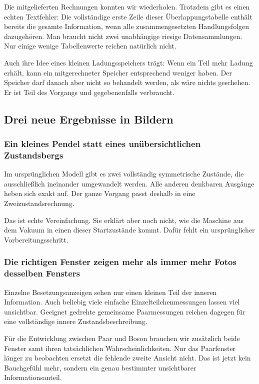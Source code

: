 \documentclass[
  ngerman,
  10pt,
  a4paper,
]{article}
\begin{document}
Die mitgelieferten Rechnungen konnten wir wiederholen. Trotzdem gibt es
einen echten Textfehler: Die vollständige erste Zeile dieser
Überlappungstabelle enthält bereits die gesamte Information, wenn alle
zusammengesetzten Handlungsfolgen dazugehören. Man braucht nicht zwei
unabhängige riesige Datensammlungen. Nur einige wenige Tabellenwerte
reichen natürlich nicht.

Auch ihre Idee eines kleinen Ladungsspeichers trägt: Wenn ein Teil mehr
Ladung erhält, kann ein mitgerechneter Speicher entsprechend weniger
haben. Der Speicher darf danach aber nicht so behandelt werden, als wäre
nichts geschehen. Er ist Teil des Vorgangs und gegebenenfalls
verbraucht.

\subsection{Drei neue Ergebnisse in
Bildern}\label{drei-neue-ergebnisse-in-bildern}

\subsubsection{Ein kleines Pendel statt eines unübersichtlichen
Zustandsbergs}\label{ein-kleines-pendel-statt-eines-unuxfcbersichtlichen-zustandsbergs}

Im ursprünglichen Modell gibt es zwei vollständig symmetrische Zustände,
die ausschließlich ineinander umgewandelt werden. Alle anderen denkbaren
Ausgänge heben sich exakt auf. Der ganze Vorgang passt deshalb in eine
Zweizustandsrechnung.

Das ist echte Vereinfachung. Sie erklärt aber noch nicht, wie die
Maschine aus dem Vakuum in einen dieser Startzustände kommt. Dafür fehlt
ein ursprünglicher Vorbereitungsschritt.

\subsubsection{Die richtigen Fenster zeigen mehr als immer mehr Fotos
desselben
Fensters}\label{die-richtigen-fenster-zeigen-mehr-als-immer-mehr-fotos-desselben-fensters}

Einzelne Besetzungsanzeigen sehen nur einen kleinen Teil der inneren
Information. Auch beliebig viele einfache Einzelteilchenmessungen lassen
viel unsichtbar. Geeignet gedrehte gemeinsame Paarmessungen reichen
dagegen für eine vollständige innere Zustandsbeschreibung.

Für die Entwicklung zwischen Paar und Boson brauchen wir zusätzlich
beide Fenster samt ihren tatsächlichen Wahrscheinlichkeiten. Nur das
Paarfenster länger zu beobachten ersetzt die fehlende zweite Ansicht
nicht. Das ist jetzt kein Bauchgefühl mehr, sondern ein genau bestimmter
unsichtbarer Informationsanteil.
\end{document}
